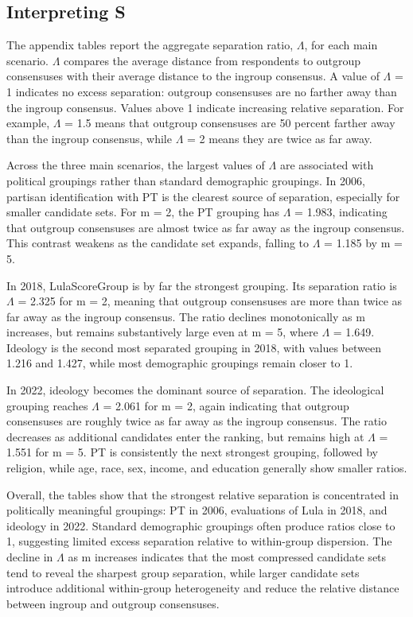 \documentclass[12pt]{article}
\begin{document}


\subsection{Interpreting S}


  The appendix tables report the aggregate separation ratio, \(\Lambda\), for each main scenario. \(\Lambda\) compares the average distance from respondents to outgroup consensuses with their average distance to
  the ingroup consensus. A value of \(\Lambda\) = 1 indicates no excess separation: outgroup consensuses are no farther away than the ingroup consensus. Values above 1 indicate increasing relative
  separation. For example, \(\Lambda\) = 1.5 means that outgroup consensuses are 50 percent farther away than the ingroup consensus, while \(\Lambda\) = 2 means they are twice as far away.

  Across the three main scenarios, the largest values of \(\Lambda\) are associated with political groupings rather than standard demographic groupings. In 2006, partisan identification with PT is the
  clearest source of separation, especially for smaller candidate sets. For m = 2, the PT grouping has \(\Lambda\) = 1.983, indicating that outgroup consensuses are almost twice as far away as the
  ingroup consensus. This contrast weakens as the candidate set expands, falling to \(\Lambda\) = 1.185 by m = 5.

  In 2018, LulaScoreGroup is by far the strongest grouping. Its separation ratio is \(\Lambda\) = 2.325 for m = 2, meaning that outgroup consensuses are more than twice as far away as the ingroup
  consensus. The ratio declines monotonically as m increases, but remains substantively large even at m = 5, where \(\Lambda\) = 1.649. Ideology is the second most separated grouping in 2018, with
  values between 1.216 and 1.427, while most demographic groupings remain closer to 1.

  In 2022, ideology becomes the dominant source of separation. The ideological grouping reaches \(\Lambda\) = 2.061 for m = 2, again indicating that outgroup consensuses are roughly twice as far away as
  the ingroup consensus. The ratio decreases as additional candidates enter the ranking, but remains high at \(\Lambda\) = 1.551 for m = 5. PT is consistently the next strongest grouping, followed by
  religion, while age, race, sex, income, and education generally show smaller ratios.

  Overall, the tables show that the strongest relative separation is concentrated in politically meaningful groupings: PT in 2006, evaluations of Lula in 2018, and ideology in 2022. Standard
  demographic groupings often produce ratios close to 1, suggesting limited excess separation relative to within-group dispersion. The decline in \(\Lambda\) as m increases indicates that the most
  compressed candidate sets tend to reveal the sharpest group separation, while larger candidate sets introduce additional within-group heterogeneity and reduce the relative distance between
  ingroup and outgroup consensuses.

  
  
\end{document}
